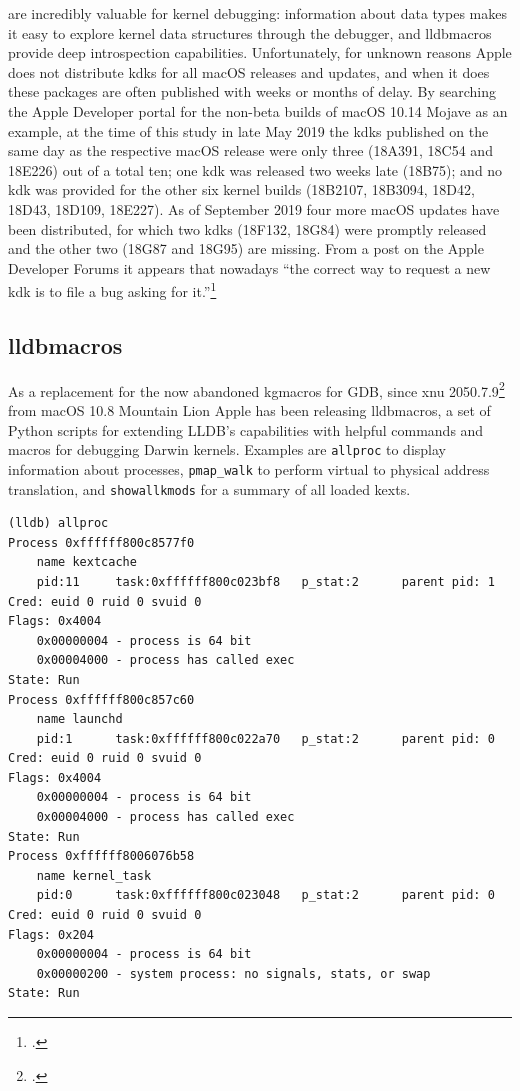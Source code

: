  are incredibly valuable for kernel debugging: information about data types makes it easy to explore kernel data structures through the debugger, and lldbmacros provide deep introspection capabilities. Unfortunately, for unknown reasons Apple does not distribute \glspl{kdk} for all macOS releases and updates, and when it does these packages are often published with weeks or months of delay. By searching the Apple Developer portal for the non-beta builds of macOS 10.14 Mojave as an example, at the time of this study in late May 2019 the \glspl{kdk} published on the same day as the respective macOS release were only three (18A391, 18C54 and 18E226) out of a total ten; one \gls{kdk} was released two weeks late (18B75); and no \gls{kdk} was provided for the other six kernel builds (18B2107, 18B3094, 18D42, 18D43, 18D109, 18E227). As of September 2019 four more macOS updates have been distributed, for which two \glspl{kdk} (18F132, 18G84) were promptly released and the other two (18G87 and 18G95) are missing. From a post on the Apple Developer Forums it appears that nowadays \enquote{the correct way to request a new \gls{kdk} is to file a bug asking for it.}\footcite{DevForums1}

\subsection{lldbmacros}\label{sec:lldbmacros}
As a replacement for the now abandoned kgmacros for GDB, since \gls{xnu} 2050.7.9\footcite{XNU205079} from macOS 10.8 Mountain Lion Apple has been releasing lldbmacros, a set of Python scripts for extending LLDB's capabilities with helpful commands and macros for debugging Darwin kernels. Examples are \lstinline{allproc} to display information about processes, \lstinline{pmap_walk} to perform virtual to physical address translation, and \lstinline{showallkmods} for a summary of all loaded \glspl{kext}.
\begin{lstlisting}[style=lldbsession,caption={Example output of the \lstinline{allproc} macro, executed during the startup process of macOS 10.14.5 Mojave build 18F132},label={lst:allproc}]
(lldb) allproc
Process 0xffffff800c8577f0
    name kextcache
    pid:11     task:0xffffff800c023bf8   p_stat:2      parent pid: 1
Cred: euid 0 ruid 0 svuid 0
Flags: 0x4004
    0x00000004 - process is 64 bit
    0x00004000 - process has called exec
State: Run
Process 0xffffff800c857c60
    name launchd
    pid:1      task:0xffffff800c022a70   p_stat:2      parent pid: 0
Cred: euid 0 ruid 0 svuid 0
Flags: 0x4004
    0x00000004 - process is 64 bit
    0x00004000 - process has called exec
State: Run
Process 0xffffff8006076b58
    name kernel_task
    pid:0      task:0xffffff800c023048   p_stat:2      parent pid: 0
Cred: euid 0 ruid 0 svuid 0
Flags: 0x204
    0x00000004 - process is 64 bit
    0x00000200 - system process: no signals, stats, or swap
State: Run
\end{lstlisting}

